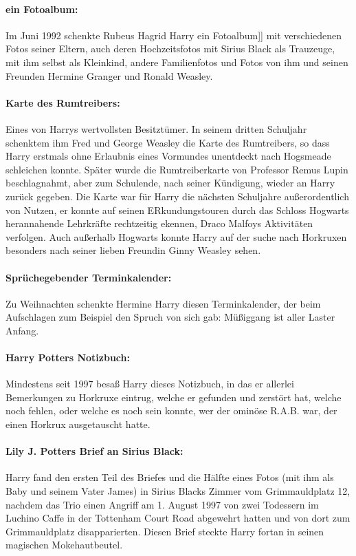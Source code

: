 \documentclass[a4paper, 10pt]{article}
\begin{document}
\paragraph{ein Fotoalbum:}
Im Juni 1992 schenkte Rubeus Hagrid Harry ein Fotoalbum]] mit verschiedenen Fotos seiner Eltern, auch deren Hochzeitsfotos mit Sirius Black als Trauzeuge, mit ihm selbst als Kleinkind, andere Familienfotos und Fotos von ihm und seinen Freunden Hermine Granger und Ronald Weasley.
\paragraph{Karte des Rumtreibers:}
Eines von Harrys wertvollsten Besitztümer. In seinem dritten Schuljahr schenktem ihm Fred und George Weasley die Karte des Rumtreibers, so dass Harry erstmals ohne Erlaubnis eines Vormundes unentdeckt nach Hogsmeade schleichen konnte. Später wurde die Rumtreiberkarte von Professor Remus Lupin beschlagnahmt, aber zum Schulende, nach seiner Kündigung, wieder an Harry zurück gegeben. Die Karte war für Harry die nächsten Schuljahre außerordentlich von Nutzen, er konnte auf seinen ERkundungstouren durch das Schloss Hogwarts herannahende Lehrkräfte rechtzeitig ekennen, Draco Malfoys Aktivitäten verfolgen. Auch außerhalb Hogwarts konnte Harry auf der suche nach Horkruxen besonders nach seiner lieben Freundin Ginny Weasley sehen.
\paragraph{Sprüchegebender Terminkalender:}
Zu Weihnachten schenkte Hermine Harry diesen Terminkalender, der beim Aufschlagen zum Beispiel den Spruch von sich gab: Müßiggang ist aller Laster Anfang.
\paragraph{Harry Potters Notizbuch:}
Mindestens seit 1997 besaß Harry dieses Notizbuch, in das er allerlei Bemerkungen zu Horkruxe eintrug, welche er gefunden und zerstört hat, welche noch fehlen, oder welche es noch sein konnte, wer der ominöse R.A.B. war, der einen Horkrux ausgetauscht hatte.
\paragraph{Lily J. Potters Brief an Sirius Black:}
Harry fand den ersten Teil des Briefes und die Hälfte eines Fotos (mit ihm als Baby und seinem Vater James) in Sirius Blacks Zimmer vom Grimmauldplatz 12, nachdem das Trio einen Angriff am 1. August 1997 von zwei Todessern im Luchino Caffe in der Tottenham Court Road abgewehrt hatten und von dort zum Grimmauldplatz disapparierten. Diesen Brief steckte Harry fortan in seinen magischen Mokehautbeutel.
\end{document}
